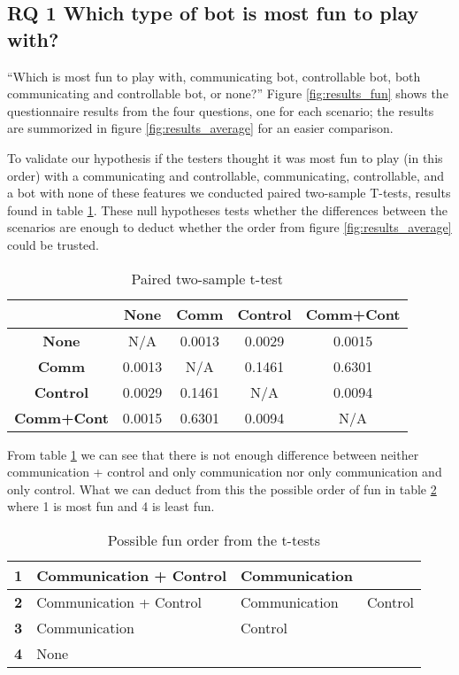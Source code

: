 \subsection{RQ 1 Which type of bot is most fun to play with?}
``Which is most fun to play with, communicating bot, controllable bot, both communicating and
controllable bot, or none?'' Figure \ref{fig:results_fun} shows the questionnaire results from the
four questions, one for each scenario; the results are summorized in figure
\ref{fig:results_average} for an easier comparison.

To validate our hypothesis if the testers thought it was most fun to play (in this order) with a communicating and
controllable, communicating, controllable, and a bot with none of these features we conducted paired two-sample
T-tests, results found in table \ref{tbl:t-test-all}. These null hypotheses tests whether the
differences between the scenarios are enough to deduct
whether the order from figure \ref{fig:results_average} could be trusted.

\begin{table}[htbp]
\begin{center}
\begin{tabular}{|c|c|c|c|c|}
\hline
 & \textbf{None} & \textbf{Comm} & \textbf{Control} & \textbf{Comm+Cont} \\ \hline
\textbf{None} & N/A & 0.0013 & 0.0029 & 0.0015 \\ \hline
\textbf{Comm} & 0.0013 & N/A & 0.1461 & 0.6301 \\ \hline
\textbf{Control} & 0.0029 & 0.1461 & N/A & 0.0094 \\ \hline
\textbf{Comm+Cont} & 0.0015 & 0.6301 & 0.0094 & N/A \\ \hline
\end{tabular}
\end{center}
\vspace{-12pt}
\caption{Paired two-sample t-test}
\label{tbl:t-test-all}
\end{table}
From table \ref{tbl:t-test-all} we can see that there is not enough difference between neither
communication + control and only communication nor only communication and only control. What we can
deduct from this the possible order of fun in table \ref{tbl:order_fun} where 1 is most fun and 4 is
least fun.

\begin{table}[htb]
	\centering
	\begin{tabular}{|l|l|l|l|}
		\hline
		\textbf{1} & Communication + Control & Communication & \\ \hline
		\textbf{2} & Communication + Control & Communication & Control \\ \hline
		\textbf{3} & Communication & Control & \\ \hline
		\textbf{4} & None & & \\ \hline

	\end{tabular}
	\caption{Possible fun order from the t-tests}
	\label{tbl:order_fun}
\end{table}

